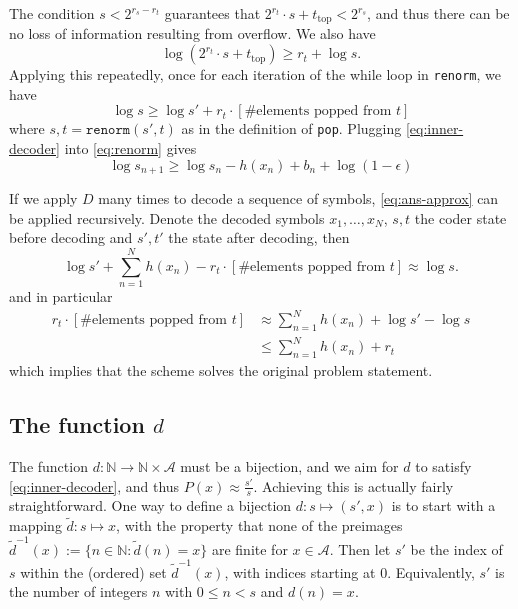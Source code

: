 \documentclass{article}
\newcommand{\pop}{\texttt{pop}}
\begin{document}
The condition $s < 2^{r_s - r_t}$ guarantees that $2^{r_t} \cdot s +
t_{\text{top}} < 2^{r_s}$, and thus there can be no loss of information
resulting from overflow. We also have
\begin{equation}
  \log (2^{r_t} \cdot s + t_\text{top}) \geq r_t + \log s.
\end{equation}
Applying this repeatedly, once for each iteration of the while loop in
\texttt{renorm}, we have
\begin{equation}\label{eq:renorm}
\log s \geq \log s' + r_t\cdot\left[\text{\# elements popped from $t$}\right]
\end{equation}
where $s, t = \texttt{renorm}(s', t)$ as in the definition of \pop. Plugging
\cref{eq:inner-decoder} into \cref{eq:renorm} gives
\begin{equation}
  \log s_{n+1} \geq \log s_n - h(x_n)
  + b_n + \log (1 -
  \epsilon)
\end{equation}

If we apply $D$ many times to decode a sequence of symbols,
\cref{eq:ans-approx} can be applied recursively. Denote the decoded symbols
$x_1, \ldots, x_N$, $s, t$ the coder state before decoding and $s', t'$ the
state after decoding, then
\begin{equation}
        \log s' + \sum_{n=1}^Nh(x_n) - r_t\cdot\left[\text{\# elements popped
        from $t$}\right] \approx \log s.
\end{equation}
and in particular
\begin{align}
         r_t\cdot\left[\text{\# elements popped
         from $t$}\right] &\approx \sum_{n=1}^Nh(x_n) + \log s' - \log s\\
                          &\leq \sum_{n=1}^Nh(x_n) + r_t
\end{align}
which implies that the scheme solves the original problem statement.

\subsection*{The function $d$}\label{sec:inner-decoder}
The function $d:\mathbb{N}\rightarrow\mathbb{N}\times\mathcal{A}$ must be a
bijection, and we aim for $d$ to satisfy \cref{eq:inner-decoder}, and thus
$P(x)\approx \frac{s'}{s}$.  Achieving this is actually fairly straightforward.
One way to define a bijection $d:s\mapsto(s', x)$ is to start with a mapping
$\tilde d: s\mapsto x$, with the property that none of the preimages $\tilde
d^{-1}(x):=\{n\in\mathbb{N}:\tilde d(n) = x\}$ are finite for
$x\in\mathcal{A}$. Then let $s'$ be the index of $s$ within the (ordered) set
$\tilde d^{-1}(x)$, with indices starting at $0$. Equivalently, $s'$ is the
number of integers $n$ with $0\leq n<s$ and $d(n) = x$.
\end{document}
